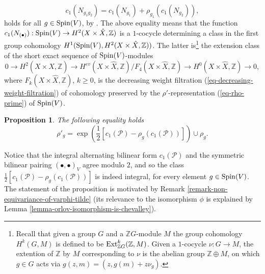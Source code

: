 \documentclass[12pt]{amsart}
\numberwithin{equation}{subsection}
\theoremstyle{plain}
\newtheorem{prop}[thm]{Proposition}
\theoremstyle{definition}
\newcommand{\ZZ}{{\mathbb Z}}
\renewcommand{\P}{{\mathcal P}}
\newcommand{\Spin}{{\rm Spin}}
\newcommand{\Ext}{{\rm Ext}}
\begin{document}
\begin{equation}
\label{eq-1-cocycle-identity}
c_1(N_{g_1g_2})=c_1(N_{g_1})+\rho_{g_1}(c_1(N_{g_2})),
\end{equation}
holds for all $g\in \Spin(V)$, by \cite[Exercise 9.41]{huybrechts-derived-categories-book}. 
The above equality means that the function $c_1(N_{(\bullet)}):\Spin(V)\rightarrow H^2(X\times\hat{X},\ZZ)$
is a $1$-cocycle determining a class in the first group cohomology $H^1(\Spin(V),H^2(X\times\hat{X},\ZZ))$. The latter is\footnote{Recall that given a group $G$ and a $\ZZ G$-module $M$ the group cohomology $H^k(G,M)$ is defined to be $\Ext^k_{\ZZ G}(\ZZ,M)$. Given a $1$-cocycle $\nu:G\rightarrow M$, the extention of $\ZZ$ by $M$ corresponding to $\nu$ is the abelian group $\ZZ\oplus M$, on which $g\in G$ acts via $g(z,m)=(z,g(m)+z\nu_g)$.} 
the extension class of the short exact sequence of $\Spin(V)$-modules
\[
0\rightarrow H^2(X\times\hat{X},\ZZ)\rightarrow H^{ev}(X\times\hat{X},\ZZ)/F_4(X\times\hat{X},\ZZ)\rightarrow H^0(X\times\hat{X},\ZZ)\rightarrow 0,
\]
where $F_k(X\times\hat{X},\ZZ)$, $k\geq 0$,  is the decreasing weight filtration 
(\ref{eq-decreasing-weight-filtration})
of cohomology preserved by the $\rho'$-representation (\ref{eq-rho-prime}) of $\Spin(V)$.

 
\begin{prop} 
\label{prop-extension-class-of-decreasing-filtration-of-spin-V-representations}
The following equality holds 
\begin{equation}
\label{eq-relating-rho-and-rho-prime}
\rho'_g=\exp\left(\frac{1}{2}[c_1(\P)-\rho_g(c_1(\P))]\right)\cup \rho_g.
\end{equation}
\end{prop}

Notice that the integral alternating bilinear form 
$c_1(\P)$ and the symmetric bilinear pairing $(\bullet,\bullet)_V$ agree modulo $2$, and so the class 
$\frac{1}{2}[c_1(\P)-\rho_g(c_1(\P))]$ is indeed integral, for every element $g\in\Spin(V)$.
The statement of the proposition is motivated by  
Remark \ref{remark-non-equivariance-of-varphi-tilde} (its relevance to the isomorphism $\phi$ is explained by 
Lemma \ref{lemma-orlov-isomorphism-is-chevalley}). 
\end{document}
